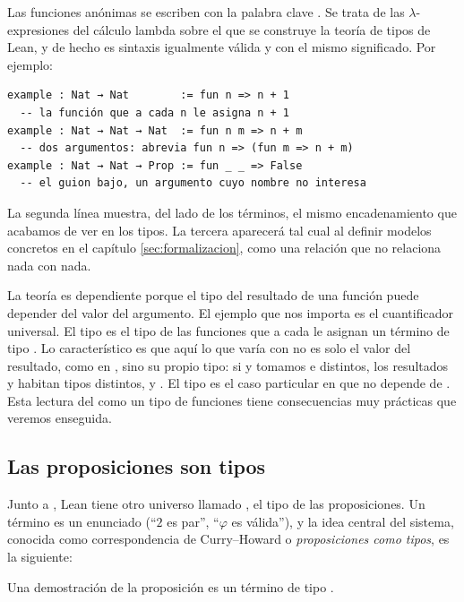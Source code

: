 Las funciones anónimas se escriben con la palabra clave . Se trata de las $\lambda$-expresiones del cálculo lambda sobre el que se construye la teoría de tipos de Lean, y de hecho  es sintaxis igualmente válida y con el mismo significado. Por ejemplo:

\begin{lstlisting}
example : Nat → Nat        := fun n => n + 1
  -- la función que a cada n le asigna n + 1
example : Nat → Nat → Nat  := fun n m => n + m
  -- dos argumentos: abrevia fun n => (fun m => n + m)
example : Nat → Nat → Prop := fun _ _ => False
  -- el guion bajo, un argumento cuyo nombre no interesa
\end{lstlisting}

La segunda línea muestra, del lado de los términos, el mismo encadenamiento que acabamos de ver en los tipos. La tercera aparecerá tal cual al definir modelos concretos en el capítulo \ref{sec:formalizacion}, como una relación que no relaciona nada con nada.

La teoría es dependiente porque el tipo del resultado de una función puede depender del valor del argumento. El ejemplo que nos importa es el cuantificador universal. El tipo  es el tipo de las funciones que a cada  le asignan un término de tipo . Lo característico es que aquí lo que varía con  no es solo el valor del resultado, como en , sino su propio tipo: si  y tomamos  e  distintos, los resultados  y  habitan tipos distintos,  y . El tipo  es el caso particular en que  no depende de . Esta lectura del  como un tipo de funciones tiene consecuencias muy prácticas que veremos enseguida.

\subsection{Las proposiciones son tipos}

Junto a , Lean tiene otro universo llamado , el tipo de las proposiciones. Un término  es un enunciado (``$2$ es par'', ``$\varphi$ es válida''), y la idea central del sistema, conocida como correspondencia de Curry--Howard o \emph{proposiciones como tipos}, es la siguiente:

\begin{center}
Una demostración de la proposición  es un término de tipo .
\end{center}

